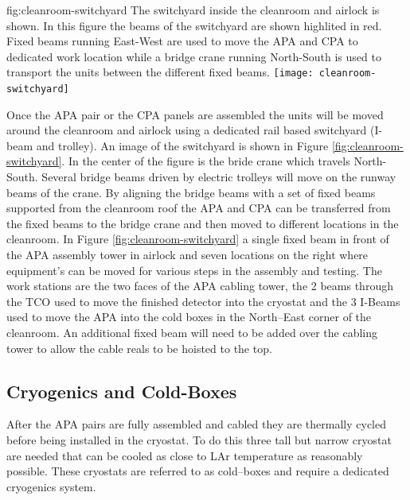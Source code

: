 \begin{dunefigure}{fig:cleanroom-switchyard}
  {The switchyard inside the cleanroom and airlock is shown. In this figure the beams of the switchyard are shown highlited in red. Fixed beams running East-West are used to move the APA and CPA to dedicated work location while a bridge crane running North-South is used to transport the units between the different fixed beams. }
\texttt{[image: cleanroom-switchyard]}
\end{dunefigure}

Once the APA pair or the CPA panels are assembled the units will be moved around the cleanroom and airlock using a dedicated rail based switchyard (I-beam and trolley). An image of the switchyard is shown in Figure \ref{fig:cleanroom-switchyard}. In the center of the figure is the bride crane which travels North-South. Several bridge beams driven by electric trolleys will move on the runway beams of the crane.  By aligning the bridge beams with a set of fixed beams supported from the cleanroom roof the APA and CPA can be transferred from the fixed beams to the bridge crane and then moved to different locations in the cleanroom. In Figure \ref{fig:cleanroom-switchyard} a single fixed beam in front of the APA assembly tower in airlock and seven locations on the right where equipment's can be moved for various steps in the assembly and testing. The work stations are the two faces of the APA cabling tower, the 2 beams through the TCO used to move the finished detector into the cryostat and the 3 I-Beams used to move the APA into the cold boxes in the North--East corner of the cleanroom. An additional fixed beam will need to be added over the cabling tower to allow the cable reals to be hoisted to the top. 

\subsection{Cryogenics and Cold-Boxes}
\label{sec:fdsp-tc-infr-cryo}
After the APA pairs are fully assembled and cabled they are thermally cycled before being installed in the cryostat. To do this three tall but narrow cryostat are needed that can be cooled as close to LAr temperature as reasonably possible. These cryostats are referred to as cold--boxes and require a dedicated cryogenics system. 




